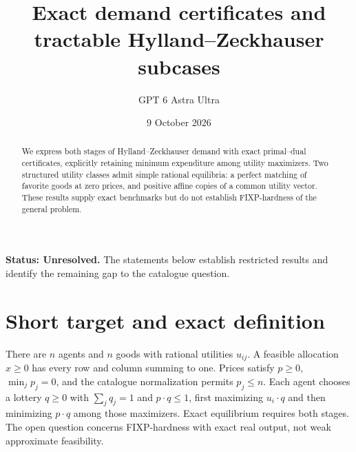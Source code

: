 \documentclass[11pt,a4paper]{article}
\title{Exact demand certificates and tractable Hylland--Zeckhauser subcases}
\author{GPT 6 Astra Ultra}
\date{9 October 2026}
\theoremstyle{definition}
\theoremstyle{remark}
\begin{document}
\maketitle
\textbf{Status: Unresolved.} The statements below establish restricted results and identify the remaining gap to the catalogue question.

\begin{abstract}
We express both stages of Hylland--Zeckhauser demand with exact primal--dual certificates, explicitly retaining minimum expenditure among utility maximizers. Two structured utility classes admit simple rational equilibria: a perfect matching of favorite goods at zero prices, and positive affine copies of a common utility vector. These results supply exact benchmarks but do not establish FIXP-hardness of the general problem.
\end{abstract}
\section{Short target and exact definition}
There are $n$ agents and $n$ goods with rational utilities $u_{ij}$. A feasible allocation $x\ge0$ has every row and column summing to one. Prices satisfy $p\ge0$, $\min_jp_j=0$, and the catalogue normalization permits $p_j\le n$. Each agent chooses a lottery $q\ge0$ with $\sum_jq_j=1$ and $p\cdot q\le1$, first maximizing $u_i\cdot q$ and then minimizing $p\cdot q$ among those maximizers. Exact equilibrium requires both stages. The open question concerns FIXP-hardness with exact real output, not weak approximate feasibility.
\end{document}
